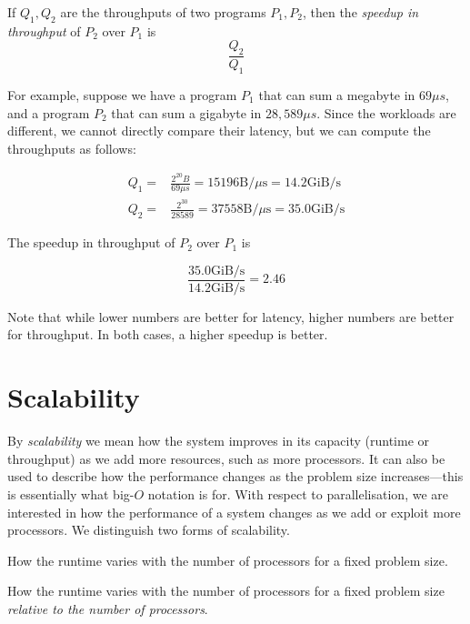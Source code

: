 \begin{definition}\label{speedup-throughput}

  If $Q_{1}, Q_{2}$ are the throughputs of two programs
  $P_{1}, P_{2}$, then the \emph{speedup in throughput} of $P_{2}$
  over $P_{1}$ is
  \[
    \frac{Q_{2}}{Q_{1}}
  \]
\end{definition}

For example, suppose we have a program $P_{1}$ that can sum a megabyte
in $69\mu{}s$, and a program $P_{2}$ that can sum a gigabyte in
$28,589\mu{}s$.  Since the workloads are different, we cannot directly
compare their latency, but we can compute the throughputs as follows:

\begin{align*}
  Q_{1} =& \frac{2^{20}B}{69\mu{}s} = 15196 \textrm{B}/\mu{}\textrm{s} = 14.2 \textrm{GiB}/\textrm{s} \\
  Q_{2} =& \frac{2^{30}}{28589} = 37558 \textrm{B}/\mu{}\textrm{s} = 35.0 \textrm{GiB}/\textrm{s}
\end{align*}

The speedup in throughput of $P_{2}$ over $P_{1}$ is

\[
  \frac{35.0 \textrm{GiB}/\textrm{s}}{14.2 \textrm{GiB}/\textrm{s}} = 2.46
\]

Note that while lower numbers are better for latency, higher numbers
are better for throughput.  In both cases, a higher speedup is better.

\section{Scalability}

By \emph{scalability} we mean how the system improves in its capacity
(runtime or throughput) as we add more resources, such as more
processors.  It can also be used to describe how the performance
changes as the problem size increases---this is essentially what
big-$O$ notation is for.  With respect to parallelisation, we are
interested in how the performance of a system changes as we add or
exploit more processors.  We distinguish two forms of scalability.

\begin{definition}
  How the runtime varies with the number of processors for a fixed
  problem size.
\end{definition}

\begin{definition}
  How the runtime varies with the number of processors for a fixed
  problem size \textit{relative to the number of processors}.
\end{definition}

